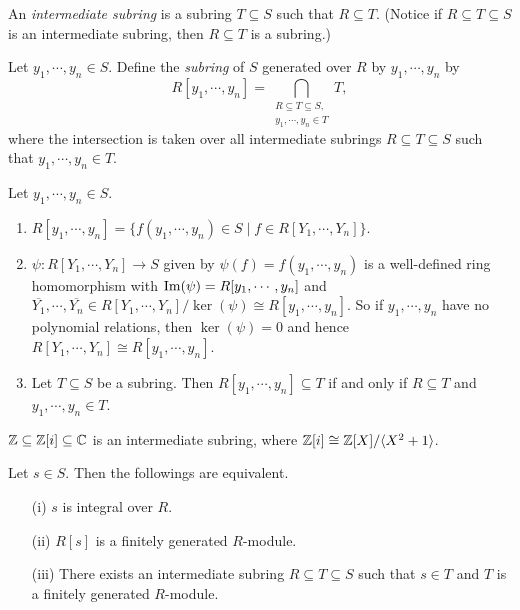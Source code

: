 \begin{definition}\label{5.10}
    An \emph{intermediate subring} is a subring $T \subseteq S$ such that $R \subseteq T$. (Notice if $R \subseteq T \subseteq S$ is an intermediate subring, then $R \subseteq T$ is a subring.) \par
    Let $y_1,\cdots,y_n \in S$. Define the \emph{subring} of $S$ generated over $R$ by $y_1,\cdots,y_n$ by
    \[R[y_1,\cdots,y_n] = \bigcap_{\substack{R \subseteq T \subseteq S, \\ y_1,\cdots,y_n \in T}}T,\]
    where the intersection is taken over all intermediate subrings $R \subseteq T \subseteq S$ such that $y_1,\cdots,y_n \in T$. \par
\end{definition}

\begin{fact}\label{5.11}
    Let $y_1,\cdots,y_n \in S$.
    \begin{enumerate}
        \item $R[y_1,\cdots,y_n] = \{f(y_1,\cdots,y_n) \in S \mid f \in R[Y_1,\cdots,Y_n]\}$.
        \item $\psi: R[Y_1,\cdots,Y_n] \to S$ given by $\psi(f) = f(y_1,\cdots,y_n)$ is a well-defined ring homomorphism with $\operatorname{Im}(\psi) = R[y_1,\cdots,y_n]$ and $\overbar{Y_1},\cdots,\overbar {Y_n} \in R[Y_1,\cdots,Y_n]/\ker(\psi) \cong R[y_1,\cdots,y_n]$. So if $y_1,\cdots,y_n$ have no polynomial relations, then $\ker(\psi) = 0$ and hence $R[Y_1,\cdots,Y_n] \cong R[y_1,\cdots,y_n]$.
        \item Let $T \subseteq S$ be a subring. Then $R[y_1,\cdots,y_n] \subseteq T$ if and only if $R \subseteq T$ and $y_1,\cdots,y_n \in T$.
    \end{enumerate}
\end{fact}

\begin{example}\label{5.12}
    $\mathbb{Z} \subseteq \mathbb{Z}[i] \subseteq \mathbb{C}$ is an intermediate subring, where $\mathbb{Z}[i] \cong \mathbb{Z}[X]/\langle X^{2}+1 \rangle$.
\end{example}

\begin{proposition}\label{5.13}
    Let $s \in S$. Then the followings are equivalent. 
    \begin{enumerate}
        \item[(i)] $s$ is integral over $R$.
        \item[(ii)] $R[s]$ is a finitely generated $R$-module.
        \item[(iii)] There exists an intermediate subring $R \subseteq T \subseteq S$ such that $s \in T$ and $T$ is a finitely generated $R$-module.
    \end{enumerate}
\end{proposition}

